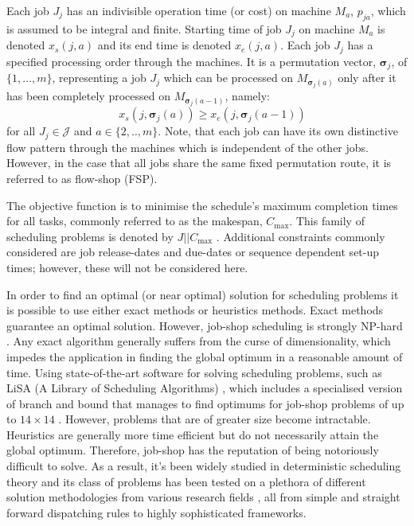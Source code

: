 \documentclass[twocolumn]{svjour3}
\newcommand{\vsigma}{\bm \sigma}
\newcommand{\dr}{dispatching rule}
\begin{document}
Each job $J_j$ has an indivisible operation time (or cost) on machine $M_a$, 
$p_{ja}$, which is assumed to be integral and finite. 
Starting time of job $J_j$ on machine $M_a$ is denoted $x_s(j,a)$ and its 
end time is denoted $x_e(j,a)$. %
Each job $J_j$ has a specified processing order through the machines. It is a 
permutation vector, $\vsigma_j$, of $\{1,\ldots,m\}$, representing a job $J_j$ 
which can be processed on $M_{\vsigma_j(a)}$ only after it has been completely 
processed on $M_{\vsigma_j(a-1)}$, namely:
\begin{equation}\quad\label{eq:permutation}
x_s(j,\vsigma_j(a)) \geq x_e(j,\vsigma_j(a-1)) 
\end{equation}
for all $J_j\in\mathcal{J}$ and $a\in\{2,..,m\}$. 
Note, that each job can have its own distinctive flow pattern through the 
machines which is independent of the other jobs. 
However, in the case that all jobs share the same fixed permutation 
route, it is referred to as flow-shop (FSP). 

The objective function is to minimise the schedule's maximum completion times 
for all tasks, commonly referred to as the makespan, $C_{\max}$. %
This family of scheduling problems is denoted by $J||C_{\max}$ 
\cite{Pinedo08}.
Additional constraints commonly considered are job release-dates and due-dates 
or sequence dependent set-up times; however, these will not be considered here. 

In order to find an optimal (or near optimal) solution for scheduling problems 
it is possible to use either exact methods or heuristics methods. Exact methods 
guarantee an optimal solution. However, job-shop scheduling is strongly NP-hard 
\cite{Garey76:NPhard}. Any exact algorithm generally suffers from the curse of 
dimensionality, which impedes the application in finding the global optimum in 
a reasonable amount of time. 
Using state-of-the-art software for solving scheduling problems, such as 
LiSA %
(A Library of Scheduling Algorithms) \cite{LiSA}, which includes a specialised 
version of branch and bound that manages to find optimums for job-shop problems 
of 
up to $14\times14$ \cite{Ru12}. However, problems that are of greater size 
become intractable. 
Heuristics are generally more time efficient but 
do not necessarily attain the global optimum. Therefore, job-shop has the 
reputation of being notoriously difficult to solve. 
As a result, it's been widely studied in deterministic scheduling theory and 
its class of problems has been tested on a plethora of different solution 
methodologies from various research fields \cite{Meeran12}, all from simple and 
straight forward \dr s to highly sophisticated frameworks.
\end{document}
